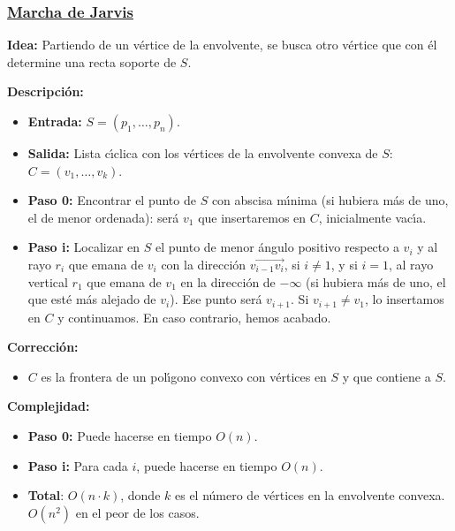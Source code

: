 \documentclass[twoside]{report}
\begin{document}
\subsubsection{\underline{Marcha de Jarvis}}

{\bf Idea:} Partiendo de un v\'{e}rtice de la envolvente, se
busca otro v\'{e}rtice que con \'{e}l determine una recta soporte de $S$.

\vspace{0.5cm}

{\bf Descripci\'{o}n:}
\begin{itemize}
  \item \textbf{Entrada:} $S=(p_1,\dots,p_n)$.
  \item \textbf{Salida:} Lista c\'{\i}clica con los v\'{e}rtices de la envolvente
convexa de $S$: $C=(v_1,\dots,v_k)$.
  \item \textbf{Paso 0:} Encontrar el punto de $S$ con abscisa m\'{\i}nima (si
hubiera m\'{a}s de uno, el de menor ordenada): ser\'{a} $v_1$ que
insertaremos en $C$, inicialmente vac\'{\i}a.
  \item \textbf{Paso i:} Localizar en $S$ el punto de menor \'{a}ngulo positivo
respecto a $v_i$ y al rayo $r_i$ que emana de $v_i$ con la
direcci\'{o}n $\overrightarrow{v_{i-1}v_i}$, si $i\neq 1$, y si $i=1$,
al rayo vertical $r_1$ que emana de $v_1$ en la direcci\'{o}n de
$-\infty$ (si hubiera m\'{a}s de uno, el que est\'{e} m\'{a}s alejado de
$v_i$). Ese punto ser\'{a} $v_{i+1}$. Si $v_{i+1}\neq v_1$, lo
insertamos en $C$ y continuamos. En caso contrario, hemos acabado.
\end{itemize}

{\bf Correcci\'{o}n:}

\begin{itemize}
  \item $C$ es la frontera de un pol\'{\i}gono convexo con v\'{e}rtices en
$S$ y que contiene a $S$.
\end{itemize}


{\bf Complejidad:}

\begin{itemize}
  \item \textbf{Paso 0:} Puede hacerse en tiempo $O(n)$.
  \item \textbf{Paso i:} Para cada $i$, puede hacerse en tiempo $O(n)$.
  \item \textbf{Total}: $O(n\cdot k)$, donde $k$ es el n\'{u}mero de v\'{e}rtices en la
envolvente convexa. $O(n^2)$ en el peor de los casos.
\end{itemize}
\end{document}
